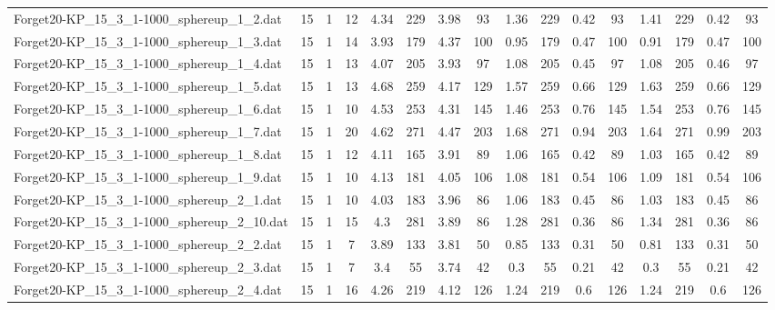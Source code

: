 \begin{sidewaystable}[!ht]
{\begin{tabular}{lccccccccccccccc}
Forget20-KP\_15\_3\_1-1000\_sphereup\_1\_2.dat & 15 & 1 & 12 & 4.34 & 229 & 3.98 & 93 & 1.36 & 229 &  \textcolor{blue2}{0.42} & 93 & 1.41 & 229 &  \textcolor{blue2}{0.42} & 93 \\
Forget20-KP\_15\_3\_1-1000\_sphereup\_1\_3.dat & 15 & 1 & 14 & 3.93 & 179 & 4.37 & 100 & 0.95 & 179 &  \textcolor{blue2}{0.47} & 100 & 0.91 & 179 &  \textcolor{blue2}{0.47} & 100 \\
Forget20-KP\_15\_3\_1-1000\_sphereup\_1\_4.dat & 15 & 1 & 13 & 4.07 & 205 & 3.93 & 97 & 1.08 & 205 &  \textcolor{blue2}{0.45} & 97 & 1.08 & 205 & 0.46 & 97 \\
Forget20-KP\_15\_3\_1-1000\_sphereup\_1\_5.dat & 15 & 1 & 13 & 4.68 & 259 & 4.17 & 129 & 1.57 & 259 &  \textcolor{blue2}{0.66} & 129 & 1.63 & 259 &  \textcolor{blue2}{0.66} & 129 \\
Forget20-KP\_15\_3\_1-1000\_sphereup\_1\_6.dat & 15 & 1 & 10 & 4.53 & 253 & 4.31 & 145 & 1.46 & 253 & 0.76 & 145 & 1.54 & 253 & 0.76 & 145 \\
Forget20-KP\_15\_3\_1-1000\_sphereup\_1\_7.dat & 15 & 1 & 20 & 4.62 & 271 & 4.47 & 203 & 1.68 & 271 &  \textcolor{blue2}{0.94} & 203 & 1.64 & 271 & 0.99 & 203 \\
Forget20-KP\_15\_3\_1-1000\_sphereup\_1\_8.dat & 15 & 1 & 12 & 4.11 & 165 & 3.91 & 89 & 1.06 & 165 &  \textcolor{blue2}{0.42} & 89 & 1.03 & 165 &  \textcolor{blue2}{0.42} & 89 \\
Forget20-KP\_15\_3\_1-1000\_sphereup\_1\_9.dat & 15 & 1 & 10 & 4.13 & 181 & 4.05 & 106 & 1.08 & 181 &  \textcolor{blue2}{0.54} & 106 & 1.09 & 181 &  \textcolor{blue2}{0.54} & 106 \\
Forget20-KP\_15\_3\_1-1000\_sphereup\_2\_1.dat & 15 & 1 & 10 & 4.03 & 183 & 3.96 & 86 & 1.06 & 183 &  \textcolor{blue2}{0.45} & 86 & 1.03 & 183 &  \textcolor{blue2}{0.45} & 86 \\
Forget20-KP\_15\_3\_1-1000\_sphereup\_2\_10.dat & 15 & 1 & 15 & 4.3 & 281 & 3.89 & 86 & 1.28 & 281 & 0.36 & 86 & 1.34 & 281 & 0.36 & 86 \\
Forget20-KP\_15\_3\_1-1000\_sphereup\_2\_2.dat & 15 & 1 & 7 & 3.89 & 133 & 3.81 & 50 & 0.85 & 133 & 0.31 & 50 & 0.81 & 133 & 0.31 & 50 \\
Forget20-KP\_15\_3\_1-1000\_sphereup\_2\_3.dat & 15 & 1 & 7 & 3.4 & 55 & 3.74 & 42 & 0.3 & 55 &  \textcolor{blue2}{0.21} & 42 & 0.3 & 55 &  \textcolor{blue2}{0.21} & 42 \\
Forget20-KP\_15\_3\_1-1000\_sphereup\_2\_4.dat & 15 & 1 & 16 & 4.26 & 219 & 4.12 & 126 & 1.24 & 219 & 0.6 & 126 & 1.24 & 219 & 0.6 & 126 \\

\end{tabular}}
\end{sidewaystable}
